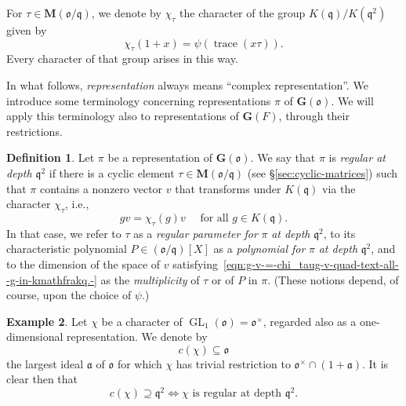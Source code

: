 \documentclass[reqno]{amsart}
\DeclareMathOperator{\GL}{GL}
\DeclareMathOperator{\trace}{trace}
\theoremstyle{plain} \newtheorem{theorem} {Theorem} \newtheorem{conjecture} {Conjecture} \newtheorem{corollary} [theorem] {Corollary} \newtheorem{proposition} [theorem] {Proposition} \newtheorem{fact} [theorem] {Fact}
\theoremstyle{definition} \newtheorem{definition} [theorem] {Definition}
\newtheorem{example} [theorem] {Example} \newtheorem{assertion}
\theoremstyle{itplain} %
\newcommand{\mfq}{\mathfrak{q}}
\begin{document}
For $\tau \in \mathbf{M}(\mathfrak{o}/\mfq)$, we denote by $\chi_\tau$ the character of the group $K(\mfq)/K(\mfq^2)$ given by
\begin{equation}\label{eqn:definition-of-chi-tau-as-psi-of-trace-x-tau}
  \chi _\tau (1 + x) = \psi (\trace (x \tau )).
\end{equation}
Every character of that group arises in this way.

In what follows, \emph{representation} always means ``complex representation''.  We introduce some terminology concerning representations $\pi$ of $\mathbf{G}(\mathfrak{o})$.  We will apply this terminology also to representations of $\mathbf{G}(F)$, through their restrictions.
\begin{definition}\label{definition:we-say-that-pi-emphr-at-depth-mathfr-if-there-cycl-regular-depth-parameter-polynomial}
  Let $\pi$ be a representation of $\mathbf{G}(\mathfrak{o})$.  We say that $\pi$ is \emph{regular at depth $\mfq^2$} if there is a cyclic element $\tau \in \mathbf{M}(\mathfrak{o}/\mfq)$ (see \S\ref{sec:cyclic-matrices}) such that $\pi$ contains a nonzero vector $v$ that transforms under $K (\mfq )$ via the character $\chi_\tau$, i.e.,
  \begin{equation}\label{eqn:g-v-=-chi_taug-v-quad-text-all--g-in-kmathfrakq.-}
    g v = \chi_\tau(g) v \quad \text{ for all } g \in K(\mfq).
  \end{equation}
  In that case, we refer to $\tau$ as a \emph{regular parameter for} $\pi$ \emph{at depth} $\mfq^2$, to its characteristic polynomial $P \in (\mathfrak{o}/\mfq)[X]$ as a \emph{polynomial for} $\pi$ \emph{at depth} $\mfq^2 $, and to the dimension of the space of $v$ satisfying~\eqref{eqn:g-v-=-chi_taug-v-quad-text-all--g-in-kmathfrakq.-} as the \emph{multiplicity} of $\tau$ or of $P$ in $\pi$.  (These notions depend, of course, upon the choice of $\psi$.)
\end{definition}

\begin{example}\label{example:cj2i1fuxey}
  Let $\chi$ be a character of $\GL_1(\mathfrak{o}) = \mathfrak{o}^\times$, regarded also as a one-dimensional representation.  We denote by
  \begin{equation*}
    c(\chi) \subseteq \mathfrak{o}
  \end{equation*}
  the largest ideal $\mathfrak{a}$ of $\mathfrak{o}$ for which $\chi$ has trivial restriction to $\mathfrak{o}^\times \cap (1 + \mathfrak{a})$.  It is clear then that
  \begin{equation*}
    c(\chi) \supseteq \mfq^2 \iff \text{$\chi$ is regular at depth $\mfq^2$}.
  \end{equation*}
\end{example}
\end{document}
